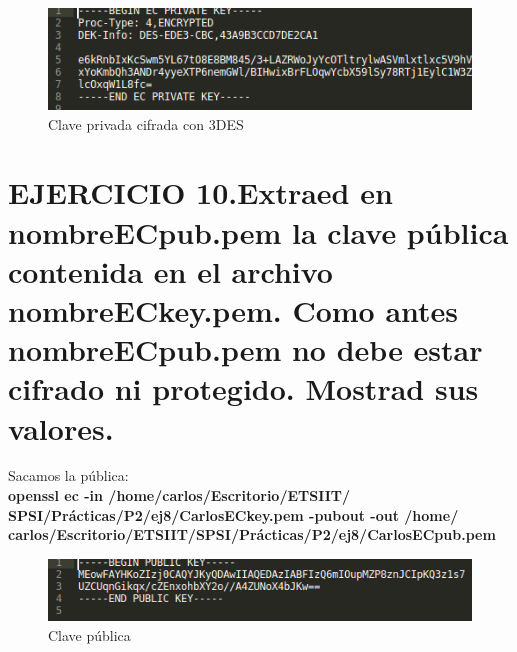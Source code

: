 \begin{figure}[H] %
	\centering
	\includegraphics[scale=0.8]{imagenes/CarlosECpriv} 
	\caption{Clave privada cifrada con 3DES} \label{etiq}
\end{figure}









\section{EJERCICIO 10.Extraed en nombreECpub.pem la clave pública contenida en el archivo nombreECkey.pem. Como antes	nombreECpub.pem no debe estar cifrado ni protegido. Mostrad sus valores.}
Sacamos la pública:\\
\textbf{openssl ec -in /home/carlos/Escritorio/ETSIIT/\\SPSI/Prácticas/P2/ej8/CarlosECkey.pem -pubout -out /home/\\carlos/Escritorio/ETSIIT/SPSI/Prácticas/P2/ej8/CarlosECpub.pem}

\begin{figure}[H] %
	\centering
	\includegraphics[scale=0.8]{imagenes/CarlosECpub} 
	\caption{Clave pública} \label{etiq}
\end{figure}


\newpage





